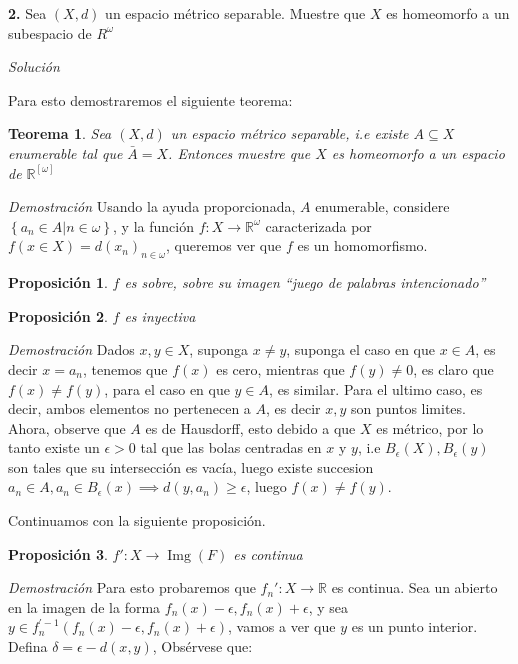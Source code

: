 \documentclass[]{article}
\newtheorem{thm}{Teorema}
\newtheorem{prop}{Proposición}
\newcommand{\set}[1]{\left\lbrace #1 \right\rbrace}
\newcommand{\RR}{\mathbb{R}}
\newcommand{\function}[3]{#1 : #2 \rightarrow #3}
\newcommand{\contained}{\subseteq}
\begin{document}
\textbf{2.} Sea $ (X,d) $ un espacio métrico separable. Muestre que $ X $ es homeomorfo a un subespacio de $ R^{\omega} $

\emph{Solución}

Para esto demostraremos el siguiente teorema:

\begin{thm}
	Sea $ (X,d) $ un espacio métrico separable, i.e existe $ A \contained X $ enumerable tal que $ \bar{A} = X $. Entonces muestre que $ X $ es homeomorfo a un espacio de $ \RR^[\omega] $
	
\end{thm}

\textit{Demostración} Usando la ayuda proporcionada, $A$ enumerable, considere $ \set{a_n \in A | n \in \omega} $, y la función $ \function{f}{X}{\RR^{\omega}} $ caracterizada por $ f(x \in X) = d(x_n)_{n \in \omega} $, queremos ver que $f$ es un homomorfismo.

\begin{prop}
	$f$ es sobre, sobre su imagen \emph{``juego de palabras intencionado''}
\end{prop}

\begin{prop}
	$f$ es inyectiva
\end{prop}
 
 \textit{Demostración} Dados $ x,y \in X $, suponga $ x \neq y $, suponga el caso en que $ x \in A $, es decir $ x = a_n $, tenemos que $ f(x) $ es cero, mientras que $ f(y) \neq 0$, es claro que $ f(x) \neq f(y) $, para el caso en que $ y \in A$, es similar. Para el ultimo caso, es decir, ambos elementos no pertenecen a $A$, es decir $ x,y $ son puntos limites. Ahora, observe que $A$ es de Hausdorff, esto debido a que $X$ es métrico, por lo tanto existe un $ \epsilon>0 $ tal que las bolas centradas en $x$ y $y$, i.e $ B_\epsilon(X), B_\epsilon(y) $ son tales que su intersección es vacía, luego existe succesion $ a_n \in A, a_n \in B_{\epsilon}(x) \implies d(y,a_n) \geq \epsilon$, luego $ f(x) \neq f(y) $.
 
 Continuamos con la siguiente proposición.
 
 \begin{prop}
 	$ \function{f'}{X}{\operatorname{Img}(F)}$ es continua 
 \end{prop}
 
 \textit{Demostración} Para esto  probaremos que $ f_n': X \rightarrow \RR $ es continua. Sea un abierto en la imagen de la forma $ f_n(x) - \epsilon, f_n(x) + \epsilon $, y sea $ y \in f^{'-1}_n(f_n(x) - \epsilon, f_n(x) + \epsilon) $, vamos a ver que $y$ es un punto interior. Defina $ \delta = \epsilon - d(x,y) $, Obsérvese que:
 
\end{document}
